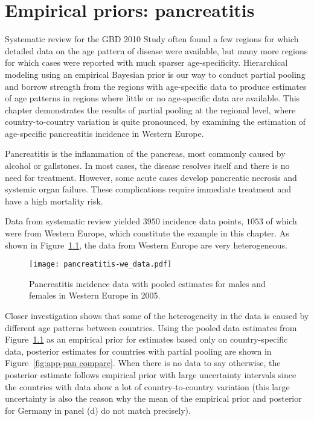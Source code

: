 \chapter{Empirical priors: pancreatitis}
\label{applications-priors_empirical}

Systematic review for the GBD 2010 Study often found a few regions for
which detailed data on the age pattern of disease were available, but
many more regions for which cases were reported with much sparser
age-specificity.  Hierarchical modeling using an empirical Bayesian
prior is our way to conduct partial pooling and borrow strength from
the regions with age-specific data to produce estimates of age
patterns in regions where little or no age-specific data are
available.  This chapter demonstrates the results of partial pooling
at the regional level, where country-to-country variation is quite
pronounced, by examining the estimation of age-specific pancreatitis
incidence in Western Europe.

Pancreatitis is the inflammation of the pancreas, most commonly
caused by alcohol or gallstones.  In most cases, the disease resolves
itself and there is no need for treatment.  However, some acute
cases develop pancreatic necrosis and systemic organ failure.  These
complications require immediate treatment and have a high mortality risk.
\cite{raraty_acute_2004-1, banks_epidemiology_2002, sekimoto_jpn_2006}

Data from systematic review yielded $3950$ incidence data points,
$1053$ of which were from Western Europe, which constitute the example
in this chapter.  As shown in Figure~\ref{fig:app-pan data}, the data
from Western Europe are very heterogeneous.

    \begin{figure}[h]
        \begin{center}
            \texttt{[image: pancreatitis-we\_data.pdf]}
            \caption{Pancreatitis incidence data
              with pooled estimates for males and females in Western Europe in 2005.}
            \label{fig:app-pan data}
        \end{center}
    \end{figure}

Closer investigation shows that some of the heterogeneity in the data
is caused by different age patterns between countries.  Using the
pooled data estimates from Figure~\ref{fig:app-pan data} as an
empirical prior for estimates based only on country-specific data,
posterior estimates for countries with partial pooling are shown in
Figure~\ref{fig:app-pan compare}.  When there is no data to say
otherwise, the posterior estimate follows empirical prior with large
uncertainty intervals since the countries with data show a lot of
country-to-country variation (this large uncertainty is also the
reason why the mean of the empirical prior and posterior for Germany
in panel (d) do not match precisely).

